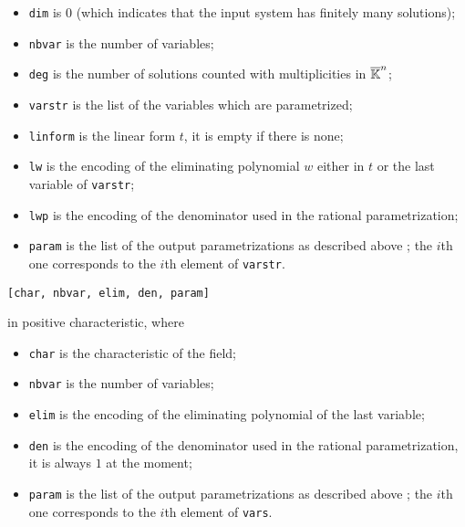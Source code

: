 \documentclass[a4paper,english,11pt]{scrartcl}
\theoremstyle{definition}
\theoremstyle{remark}
\begin{document}
\begin{itemize}
\item \texttt{dim} is $0$ (which indicates that the input system has finitely
  many solutions);
\item \texttt{nbvar} is the number of variables;
\item \texttt{deg} is the number of solutions counted with multiplicities in
  $\overline{\mathbb{K}}^n$;
\item \texttt{varstr} is the list of the variables which are parametrized;
\item \texttt{linform} is the linear form $t$, it is empty if there is none;
\item \texttt{lw} is the encoding of the eliminating polynomial $w$
  either in $t$ or the last variable of \texttt{varstr};
\item \texttt{lwp} is the encoding of the denominator used in the rational
  parametrization;
\item \texttt{param} is the list of the output parametrizations as described
  above ; the $i$th one corresponds to the $i$th element of \texttt{varstr}.
\end{itemize}
\begin{verbatim}
[char, nbvar, elim, den, param]
\end{verbatim}
in positive characteristic, where
\begin{itemize}
\item \texttt{char} is the characteristic of the field;
\item \texttt{nbvar} is the number of variables;
\item \texttt{elim} is the encoding of the eliminating polynomial of
  the last variable;
\item \texttt{den} is the encoding of the denominator used in the rational
  parametrization, it is always $1$ at the moment;
\item \texttt{param} is the list of the output parametrizations as described
  above ; the $i$th one corresponds to the $i$th element of \texttt{vars}.
\end{itemize}
\end{document}
